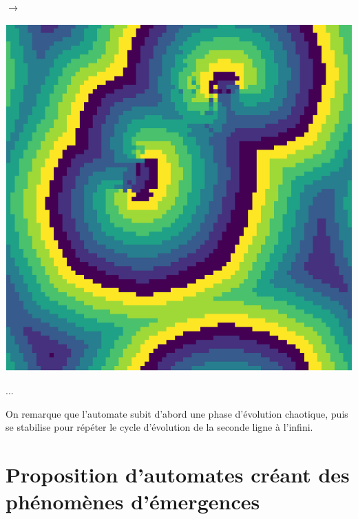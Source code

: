 \documentclass[12pt, a4paper]{article}
\begin{document}
\begin{center}
\begin{minipage}{.17\linewidth}
            \end{minipage}
            $\rightarrow$
            \begin{minipage}{.17\linewidth}
                \includegraphics[scale=0.15]{img/part2/step8.png}
            \end{minipage}
            ...
        \end{center}
        On remarque que l'automate subit d'abord une phase d'évolution chaotique, puis se stabilise pour répéter le cycle d'évolution de la seconde ligne à l'infini.
    
    
    \section{Proposition d'automates créant des phénomènes d'émergences}
\end{document}
